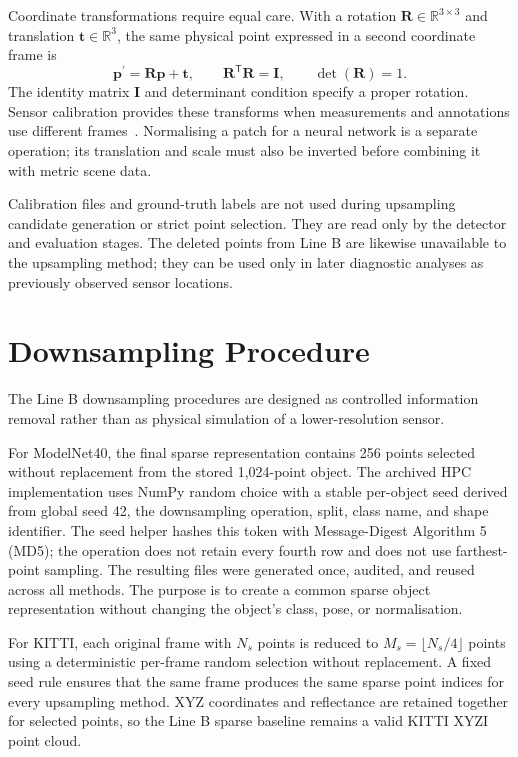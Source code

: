 Coordinate transformations require equal care. With a rotation
$\mathbf R\in\mathbb R^{3\times3}$ and translation
$\mathbf t\in\mathbb R^3$, the same physical point expressed in a second
coordinate frame is
\begin{equation}
 \mathbf p^{\prime}=\mathbf R\mathbf p+\mathbf t,
 \qquad \mathbf R^{\mathsf T}\mathbf R=\mathbf I,
 \qquad\det(\mathbf R)=1.
 \label{eq:rigid_coordinates}
\end{equation}
The identity matrix $\mathbf I$ and determinant condition specify a proper
rotation. Sensor calibration provides these transforms when measurements
and annotations use different frames~\cite{geiger2013kitti}. Normalising a
patch for a neural network is a separate operation; its translation and
scale must also be inverted before combining it with metric scene data.


Calibration files and ground-truth labels are not used during upsampling candidate generation or strict point selection. They are read only by the detector and evaluation stages. The deleted points from Line B are likewise unavailable to the upsampling method; they can be used only in later diagnostic analyses as previously observed sensor locations.

\section{Downsampling Procedure}
\label{sec:fc-4-4}

The Line B downsampling procedures are designed as controlled information removal rather than as physical simulation of a lower-resolution sensor.

For ModelNet40, the final sparse representation contains 256 points selected without replacement from the stored 1,024-point object. The archived HPC implementation uses NumPy random choice with a stable per-object seed derived from global seed 42, the downsampling operation, split, class name, and shape identifier. The seed helper hashes this token with Message-Digest Algorithm 5 (MD5); the operation does not retain every fourth row and does not use farthest-point sampling. The resulting files were generated once, audited, and reused across all methods. The purpose is to create a common sparse object representation without changing the object's class, pose, or normalisation.

For KITTI, each original frame with \ensuremath{N_s} points is reduced to $M_s=\lfloor N_s/4\rfloor$ points using a deterministic per-frame random selection without replacement. A fixed seed rule ensures that the same frame produces the same sparse point indices for every upsampling method. XYZ coordinates and reflectance are retained together for selected points, so the Line B sparse baseline remains a valid KITTI XYZI point cloud.

